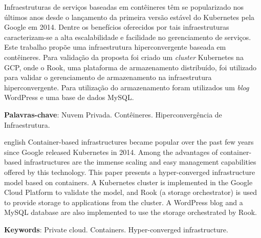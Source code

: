 \documentclass[
	12pt,				%
	openright,			%
	twoside,			%
	a4paper,			%
	chapter=TITLE,		%
	english,			%
	brazil				%
	]{abntex2}
\begin{document}
\setlength{\absparsep}{18pt} %
\begin{resumo}
Infraestruturas de serviços baseadas em contêineres têm se popularizado nos últimos anos desde o lançamento da primeira versão estável do Kubernetes pela Google em 2014. Dentre os benefícios oferecidos por tais infraestruturas caracterizam-se a alta escalabilidade e facilidade no gerenciamento de serviços. Este trabalho propõe uma infraestrutura hiperconvergente baseada em contêineres. Para validação da proposta foi criado um \textit{cluster} Kubernetes na \ac{GCP}, onde o Rook, uma plataforma de armazenamento distribuído, foi utilizado para validar o gerenciamento de armazenamento na infraestrutura hiperconvergente. Para utilização do armazenamento foram utilizados um \textit{blog} WordPress e uma base de dados MySQL. 

\textbf{Palavras-chave}: Nuvem Privada. Contêineres. Hiperconvergência de Infraestrutura.
\end{resumo}

\begin{resumo}[Abstract]
 \begin{otherlanguage*}{english}
Container-based infrastructures became popular over the past few years since Google released Kubernetes in 2014. Among the advantages of container-based infrastructures are the immense scaling and easy management capabilities offered by this technology. This paper presents a hyper-converged infrastructure model based on containers. A Kubernetes cluster is implemented in the Google Cloud Platform to validate the model, and Rook (a storage orchestrator) is used to provide storage to applications from the cluster. A WordPress blog and a MySQL database are also implemented to use the storage orchestrated by Rook.

\noindent 
\textbf{Keywords}: Private cloud. Containers. Hyper-converged infrastructure.
 \end{otherlanguage*}
\end{resumo}


\listoffigures*
\cleardoublepage
\listoftables*
\cleardoublepage
\end{document}
